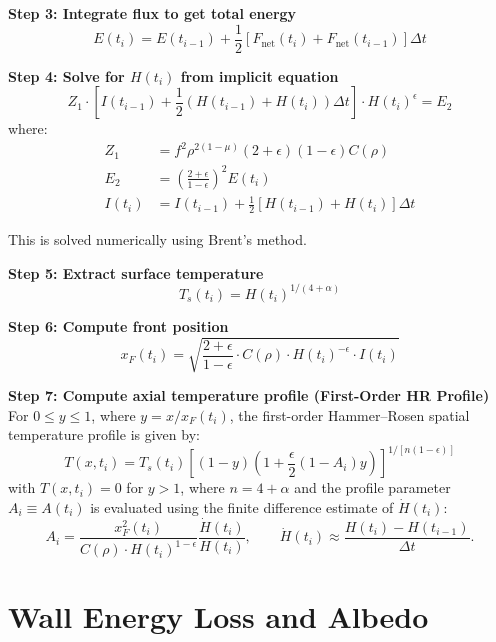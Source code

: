 \documentclass[12pt,a4paper]{article}
\begin{document}
\textbf{Step 3: Integrate flux to get total energy}
\begin{equation}
E(t_i) = E(t_{i-1}) + \frac{1}{2}\left[F_{\text{net}}(t_i) + F_{\text{net}}(t_{i-1})\right] \Delta t
\end{equation}

\textbf{Step 4: Solve for $H(t_i)$ from implicit equation}
\begin{equation}
Z_1 \cdot \left[I(t_{i-1}) + \frac{1}{2}\left(H(t_{i-1}) + H(t_i)\right)\Delta t\right] \cdot H(t_i)^\epsilon = E_2
\end{equation}
where:
\begin{align}
Z_1 &= f^2 \rho^{2(1-\mu)} (2+\epsilon)(1-\epsilon) C(\rho) \\
E_2 &= \left(\frac{2+\epsilon}{1-\epsilon}\right)^2 E(t_i) \\
I(t_i) &= I(t_{i-1}) + \frac{1}{2}\left[H(t_{i-1}) + H(t_i)\right]\Delta t
\end{align}

This is solved numerically using Brent's method.

\textbf{Step 5: Extract surface temperature}
\begin{equation}
T_s(t_i) = H(t_i)^{1/(4+\alpha)}
\end{equation}

\textbf{Step 6: Compute front position}
\begin{equation}
x_F(t_i) = \sqrt{\frac{2+\epsilon}{1-\epsilon} \cdot C(\rho) \cdot H(t_i)^{-\epsilon} \cdot I(t_i)}
\end{equation}

\textbf{Step 7: Compute axial temperature profile (First-Order HR Profile)}
For $0 \le y \le 1$, where $y = x / x_F(t_i)$, the first-order Hammer--Rosen spatial temperature profile is given by:
\begin{equation}
T(x, t_i) = T_s(t_i) \left[ (1 - y) \left( 1 + \frac{\epsilon}{2} (1 - A_i) y \right) \right]^{1/[n(1-\epsilon)]}
\end{equation}
with $T(x, t_i) = 0$ for $y > 1$, where $n = 4 + \alpha$ and the profile parameter $A_i \equiv A(t_i)$ is evaluated using the finite difference estimate of $\dot{H}(t_i)$:
\begin{equation}
A_i = \frac{x_F^2(t_i)}{C(\rho) \cdot H(t_i)^{1-\epsilon}} \frac{\dot{H}(t_i)}{H(t_i)}, \qquad \dot{H}(t_i) \approx \frac{H(t_i) - H(t_{i-1})}{\Delta t}.
\end{equation}

\section{Wall Energy Loss and Albedo}
\end{document}
